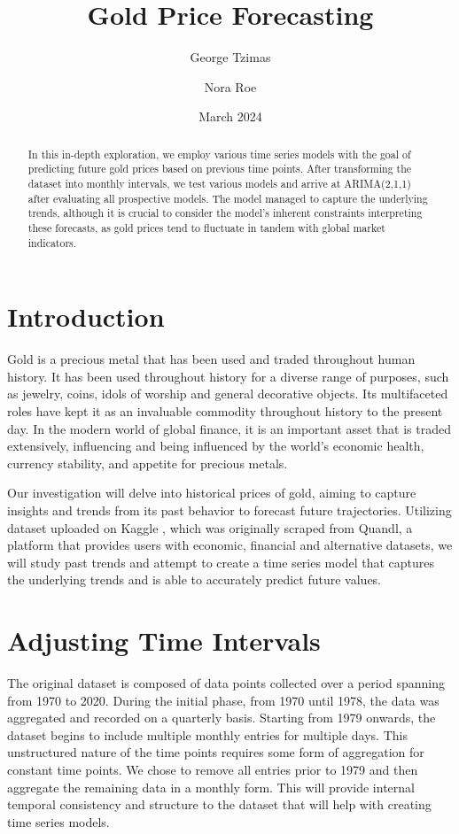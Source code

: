 \documentclass[12pt]{article}
\title{Gold Price Forecasting}
\author{George Tzimas \and Nora Roe }
\date{March 2024}
\begin{document}
\maketitle

\begin{abstract}
    In this in-depth exploration, we employ various time series models with the goal of predicting future gold prices based on previous time points. After transforming the dataset into monthly intervals, we test various models and arrive at ARIMA(2,1,1) after evaluating all prospective models. The model managed to capture the underlying trends, although it is crucial to consider the model's inherent constraints interpreting these forecasts, as gold prices tend to fluctuate in tandem with global market indicators.
\end{abstract}
\section{Introduction}
Gold is a precious metal that has been used and traded throughout human history. It has been used throughout history for a diverse range of purposes, such as jewelry, coins, idols of worship and general decorative objects. Its multifaceted roles have kept it as an invaluable commodity throughout history to the present day. In the modern world of global finance, it is an important asset that is traded extensively, influencing and being influenced by the world's economic health, currency stability, and appetite for precious metals.

Our investigation will delve into historical prices of gold, aiming to capture insights and trends from its past behavior to forecast future trajectories. Utilizing dataset uploaded on Kaggle \cite{gold_price_dataset_2020}, which was originally scraped from Quandl, a platform that provides users with economic, financial and alternative datasets, we will study past trends and attempt to create a time series model that captures the underlying trends and is able to accurately predict future values.

\section{Adjusting Time Intervals}
The original dataset is composed of data points collected over a period spanning from 1970 to 2020. During the initial phase, from 1970 until 1978, the data was aggregated and recorded on a quarterly basis. Starting from 1979 onwards, the dataset begins to include multiple monthly entries for multiple days. This unstructured nature of the time points requires some form of aggregation for constant time points. We chose to remove all entries prior to 1979 and then aggregate the remaining data in a monthly form. This will provide internal temporal consistency and structure to the dataset that will help with creating time series models.
\end{document}
